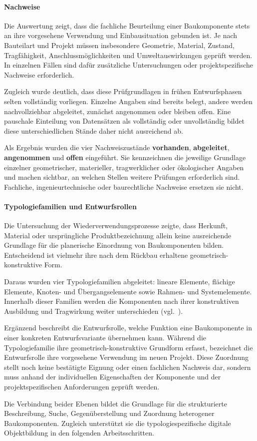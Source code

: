 \documentclass[type=zwischenbericht,theme=dark]{zukunftbau}
\begin{document}
\begin{SemioNest}
\begin{SemioNest}
\paragraph{Nachweise}
Die Auswertung zeigt, dass die fachliche Beurteilung einer Baukomponente stets an ihre vorgesehene Verwendung und Einbausituation gebunden ist. Je nach Bauteilart und Projekt müssen insbesondere Geometrie, Material, Zustand, Tragfähigkeit, Anschlussmöglichkeiten und Umweltauswirkungen geprüft werden. In einzelnen Fällen sind dafür zusätzliche Untersuchungen oder projektspezifische Nachweise erforderlich.

Zugleich wurde deutlich, dass diese Prüfgrundlagen in frühen Entwurfsphasen selten vollständig vorliegen. Einzelne Angaben sind bereits belegt, andere werden nachvollziehbar abgeleitet, zunächst angenommen oder bleiben offen. Eine pauschale Einteilung von Datensätzen als vollständig oder unvollständig bildet diese unterschiedlichen Stände daher nicht ausreichend ab.

Als Ergebnis wurden die vier Nachweiszustände \textbf{vorhanden}, \textbf{abgeleitet}, \textbf{angenommen} und \textbf{offen} eingeführt. Sie kennzeichnen die jeweilige Grundlage einzelner geometrischer, materieller, tragwerklicher oder ökologischer Angaben und machen sichtbar, an welchen Stellen weitere Prüfungen erforderlich sind. Fachliche, ingenieurtechnische oder baurechtliche Nachweise ersetzen sie nicht.
\end{SemioNest}

\paragraph{Typologiefamilien und Entwurfsrollen}
Die Untersuchung der Wiederverwendungsprozesse zeigte, dass Herkunft, Material oder ursprüngliche Produktbezeichnung allein keine ausreichende Grundlage für die planerische Einordnung von Baukomponenten bilden. Entscheidend ist vielmehr ihre nach dem Rückbau erhaltene geometrisch-konstruktive Form.

Daraus wurden vier Typologiefamilien abgeleitet: lineare Elemente, flächige Elemente, Knoten- und Übergangselemente sowie Rahmen- und Systemelemente. Innerhalb dieser Familien werden die Komponenten nach ihrer konstruktiven Ausbildung und Tragwirkung weiter unterschieden (vgl.\ ).

Ergänzend beschreibt die Entwurfsrolle, welche Funktion eine Baukomponente in einer konkreten Entwurfsvariante übernehmen kann. Während die Typologiefamilie ihre geometrisch-konstruktive Grundform erfasst, bezeichnet die Entwurfsrolle ihre vorgesehene Verwendung im neuen Projekt. Diese Zuordnung stellt noch keine bestätigte Eignung oder einen fachlichen Nachweis dar, sondern muss anhand der individuellen Eigenschaften der Komponente und der projektspezifischen Anforderungen geprüft werden.

Die Verbindung beider Ebenen bildet die Grundlage für die strukturierte Beschreibung, Suche, Gegenüberstellung und Zuordnung heterogener Baukomponenten. Zugleich unterstützt sie die typologiespezifische digitale Objektbildung in den folgenden Arbeitsschritten.
\end{SemioNest}
\end{document}
